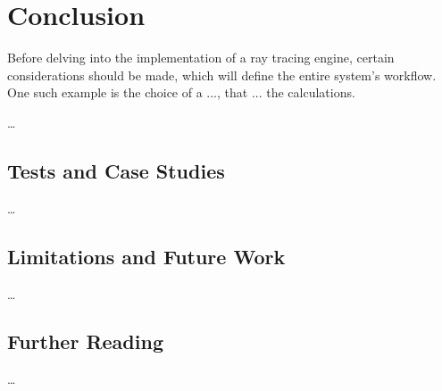 
\chapter{Conclusion} \label{ch:Conclusion}

Before delving into the implementation of a ray tracing engine, certain considerations should be made, which will define the entire system's workflow.
One such example is the choice of a ..., that ... the calculations.

\dots

\section{Tests and Case Studies}

\dots

\section{Limitations and Future Work}

\dots

\section{Further Reading}

\dots
